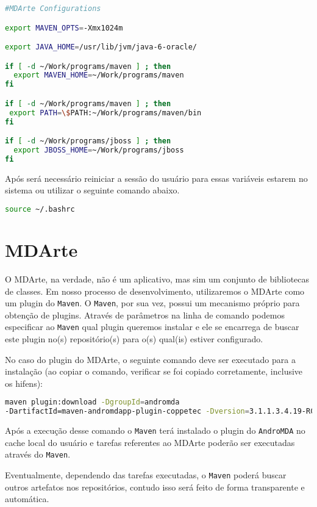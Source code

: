 \begin{lstlisting}[language=bash]
#MDArte Configurations

export MAVEN_OPTS=-Xmx1024m

export JAVA_HOME=/usr/lib/jvm/java-6-oracle/

if [ -d ~/Work/programs/maven ] ; then
  export MAVEN_HOME=~/Work/programs/maven
fi

if [ -d ~/Work/programs/maven ] ; then
 export PATH=\$PATH:~/Work/programs/maven/bin
fi

if [ -d ~/Work/programs/jboss ] ; then
  export JBOSS_HOME=~/Work/programs/jboss
fi
\end{lstlisting}

Após será necessário reiniciar a sessão do usuário para essas variáveis estarem
no sistema ou utilizar o seguinte comando abaixo.

\begin{lstlisting}[language=bash]
source ~/.bashrc
\end{lstlisting}

\section{MDArte}

O MDArte, na verdade, não é um aplicativo, mas sim um conjunto de bibliotecas de
classes. Em nosso processo de desenvolvimento, utilizaremos o MDArte como um
plugin do \texttt{Maven}. O \texttt{Maven}, por sua vez, possui um mecanismo
próprio para obtenção de plugins. Através de parâmetros na linha de comando
podemos especificar ao \texttt{Maven} qual plugin queremos instalar e ele se
encarrega de buscar este plugin no(s) repositório(s) para o(s) qual(is) estiver
configurado.

No caso do plugin do MDArte, o seguinte comando deve ser executado para a
instalação (ao copiar o comando, verificar se foi copiado corretamente,
inclusive os hifens):

\begin{lstlisting}[language=bash]
maven plugin:download -DgroupId=andromda
-DartifactId=maven-andromdapp-plugin-coppetec -Dversion=3.1.1.3.4.19-RC2
\end{lstlisting}
	
Após a execução desse comando o \texttt{Maven} terá instalado o plugin do
\texttt{AndroMDA} no cache local do usuário e tarefas referentes ao MDArte
poderão ser executadas através do \texttt{Maven}.

Eventualmente, dependendo das tarefas executadas, o \texttt{Maven} poderá buscar
outros artefatos nos repositórios, contudo isso será feito de forma transparente
e automática.

